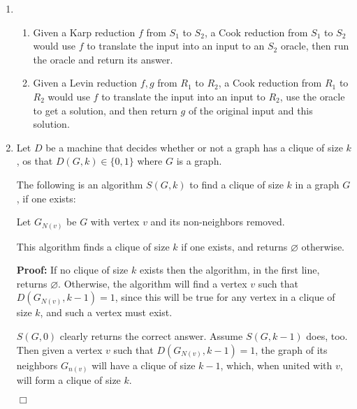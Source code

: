 \documentclass[11pt]{article} \usepackage{amssymb}
\newenvironment{proof}{\noindent \textbf{Proof:}}{$\Box$}
\begin{document}
\begin{enumerate}
\begin{itemize}
      \end{itemize}
  \item
    \begin{enumerate}
      \item 
        Given a Karp reduction $f$ from
        $S_1$ to $S_2$, a Cook reduction from $S_1$ to $S_2$ would use $f$
        to translate the input into an input to an $S_2$ oracle, then
        run the oracle and return its answer.
      \item
        Given a Levin reduction $f,g$ from $R_1$ to $R_2$, a Cook reduction
        from $R_1$ to $R_2$ would use $f$ to translate the input into an
        input to $R_2$, use the oracle to get a solution, and then return $g$
        of the original input and this solution.
    \end{enumerate}
  \item
    
    Let $D$ be a machine that decides whether or not a graph has a clique
    of size $k$, os that $D(G,k)\in \{0,1\}$ where $G$ is a graph.

    The following is an algorithm $S(G,k)$ to find a clique of size $k$ in a 
    graph $G$, if one exists:

    
    Let $G_{N(v)}$ be $G$ with vertex $v$ and its non-neighbors removed. 
    \begin{algorithmic} 
      \ELSE
      \ENDIF
    \end{algorithmic}
    
    This algorithm finds a clique of size $k$ if one exists, and returns
    $\varnothing$ otherwise.

    \begin{proof}
      If no clique of size $k$ exists then the algorithm, in the first line, 
      returns $\varnothing$. 
      Otherwise, the algorithm will find a vertex $v$ such that 
      $D(G_{N(v)},k-1)=1$, since this will be true for any vertex in a clique
      of size $k$, and such a vertex must exist.
      
      $S(G,0)$ clearly returns the correct answer. Assume $S(G,k-1)$ does, too.
      Then given a vertex $v$ such that $D(G_{N(v)},k-1)=1$, the graph of its
      neighbors $G_{n(v)}$ will have a clique of size $k-1$, which, when
      united with $v$, will form a clique of size $k$.



\end{proof}
\end{enumerate}
\end{document}
